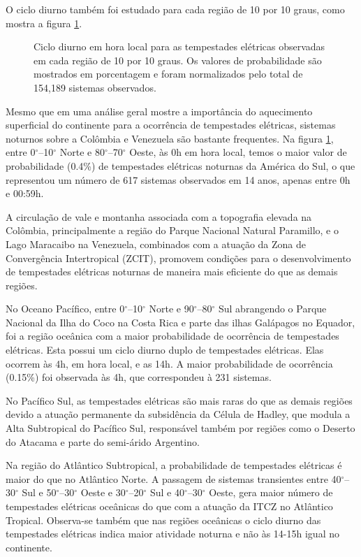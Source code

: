 O ciclo diurno também foi estudado para cada região de 10 por 10 graus, como mostra a figura \ref{diurno}. 



\begin{figure}[!hb]
\caption{Ciclo diurno em hora local para as tempestades elétricas observadas em cada região de 10 por 10 graus. Os valores de probabilidade são mostrados em porcentagem e foram normalizados pelo total de 154,189 sistemas observados.}
\label{diurno}
\end{figure}


Mesmo que em uma análise geral mostre a importância do aquecimento superficial do continente para a ocorrência de tempestades elétricas, sistemas noturnos sobre a Colômbia e Venezuela são bastante frequentes. Na figura \ref{diurno}, entre 0$^{\circ}$--10$^{\circ}$ Norte e 80$^{\circ}$--70$^{\circ}$ Oeste, às 0h em hora local, temos o maior valor de probabilidade (0.4\%) de tempestades elétricas noturnas da América do Sul, o que representou um número de 617 sistemas observados em 14 anos, apenas entre 0h e 00:59h.


A circulação de vale e montanha associada com a topografia elevada na Colômbia, principalmente a região do Parque Nacional Natural Paramillo, e o Lago Maracaibo na Venezuela, combinados com a atuação da Zona de Convergência Intertropical (ZCIT), promovem condições para o desenvolvimento de tempestades elétricas noturnas de maneira mais eficiente do que as demais regiões. 

No Oceano Pacífico, entre 0$^{\circ}$--10$^{\circ}$ Norte e 90$^{\circ}$--80$^{\circ}$ Sul abrangendo o Parque Nacional da Ilha do Coco na Costa Rica e parte das ilhas Galápagos no Equador, foi a região oceânica com a maior probabilidade de ocorrência de tempestades elétricas. Esta possui um ciclo diurno duplo de tempestades elétricas. Elas ocorrem às 4h, em hora local, e as 14h. A maior probabilidade de ocorrência (0.15\%) foi observada às 4h, que correspondeu à 231 sistemas.

No Pacífico Sul, as tempestades elétricas são mais raras do que as demais regiões devido a atuação permanente da subsidência da Célula de Hadley, que modula a Alta Subtropical do Pacífico Sul, responsável também por regiões como o Deserto do Atacama e parte do semi-árido Argentino.

Na região do Atlântico Subtropical, a probabilidade de tempestades elétricas é maior do que no Atlântico Norte. A passagem de sistemas transientes entre 40$^{\circ}$--30$^{\circ}$ Sul e 50$^{\circ}$--30$^{\circ}$ Oeste e 30$^{\circ}$--20$^{\circ}$ Sul e 40$^{\circ}$--30$^{\circ}$ Oeste, gera maior número de tempestades elétricas oceânicas do que com a atuação da ITCZ no Atlântico Tropical. Observa-se também que nas regiões oceânicas o ciclo diurno das tempestades elétricas indica maior atividade noturna e não às 14-15h igual no continente.


